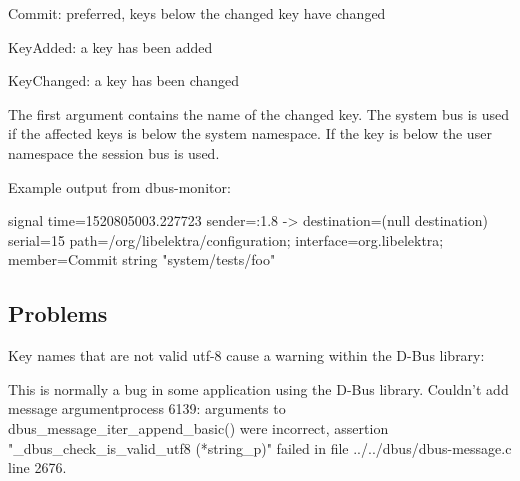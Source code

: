 \begin{DoxyItemize}
\item Commit\+: preferred, keys below the changed key have changed
\item Key\+Added\+: a key has been added
\item Key\+Changed\+: a key has been changed
\end{DoxyItemize}

The first argument contains the name of the changed key. The system bus is used if the affected keys is below the {\ttfamily system} namespace. If the key is below the {\ttfamily user} namespace the session bus is used.

Example output from {\ttfamily dbus-\/monitor}\+:


\begin{DoxyCode}
signal time=1520805003.227723 sender=:1.8 -> destination=(null destination) serial=15
       path=/org/libelektra/configuration; interface=org.libelektra; member=Commit
   string "system/tests/foo"
\end{DoxyCode}


\subsection*{Problems}

Key names that are not valid utf-\/8 cause a warning within the D-\/\+Bus library\+:


\begin{DoxyCode}
This is normally a bug in some application using the D-Bus library.
Couldn't add message argumentprocess 6139: arguments to dbus\_message\_iter\_append\_basic() were incorrect,
       assertion "\_dbus\_check\_is\_valid\_utf8 (*string\_p)" failed in file ../../dbus/dbus-message.c line 2676.
\end{DoxyCode}
 
